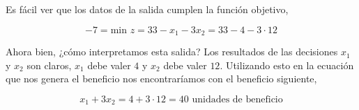 \documentclass[a4paper,12pt]{article}
\begin{document}
Es f\'acil ver que los datos de la salida cumplen la funci\'on objetivo,

$$ -7 = \text{min }z = 33 - x_1 - 3x_2 = 33 - 4 - 3 \cdot 12$$

Ahora bien, ¿c\'omo interpretamos esta salida? Los resultados de las decisiones $x_1$ y $x_2$ son claros, $x_1$ debe valer $4$ y $x_2$ debe valer $12$. Utilizando esto en la ecuaci\'on que nos genera el beneficio nos encontrar\'iamos con el beneficio siguiente,

$$ x_1 + 3x_2 = 4 + 3 \cdot 12 = 40 \text{ unidades de beneficio}$$ 
\end{document}
